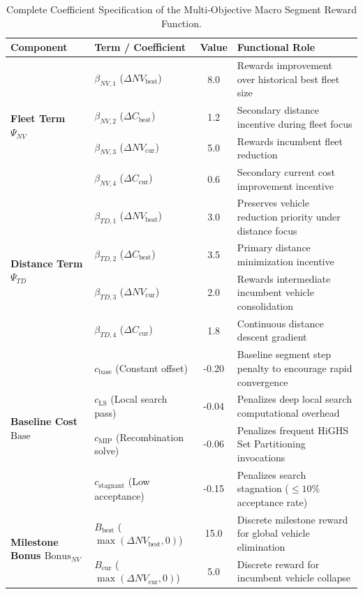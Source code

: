 \documentclass{article}
\begin{document}
\begin{table}[!htbp]
\caption{Complete Coefficient Specification of the Multi-Objective Macro Segment Reward Function.}
\label{tab:supp_reward_coefficients}
\centering
\small
\begin{tabularx}{\textwidth}{l l c X}
\toprule
\textbf{Component} & \textbf{Term / Coefficient} & \textbf{Value} & \textbf{Functional Role} \\
\midrule
\multirow{4}{*}{\textbf{Fleet Term $\Psi_{NV}$}}
 & $\beta_{NV, 1}$ ($\Delta NV_{\text{best}}$) & 8.0 & Rewards improvement over historical best fleet size \\
 & $\beta_{NV, 2}$ ($\Delta C_{\text{best}}$) & 1.2 & Secondary distance incentive during fleet focus \\
 & $\beta_{NV, 3}$ ($\Delta NV_{\text{cur}}$) & 5.0 & Rewards incumbent fleet reduction \\
 & $\beta_{NV, 4}$ ($\Delta C_{\text{cur}}$) & 0.6 & Secondary current cost improvement incentive \\
\midrule
\multirow{4}{*}{\textbf{Distance Term $\Psi_{TD}$}}
 & $\beta_{TD, 1}$ ($\Delta NV_{\text{best}}$) & 3.0 & Preserves vehicle reduction priority under distance focus \\
 & $\beta_{TD, 2}$ ($\Delta C_{\text{best}}$) & 3.5 & Primary distance minimization incentive \\
 & $\beta_{TD, 3}$ ($\Delta NV_{\text{cur}}$) & 2.0 & Rewards intermediate incumbent vehicle consolidation \\
 & $\beta_{TD, 4}$ ($\Delta C_{\text{cur}}$) & 1.8 & Continuous distance descent gradient \\
\midrule
\multirow{4}{*}{\textbf{Baseline Cost $\text{Base}$}}
 & $c_{\text{base}}$ (Constant offset) & -0.20 & Baseline segment step penalty to encourage rapid convergence \\
 & $c_{\text{LS}}$ (Local search pass) & -0.04 & Penalizes deep local search computational overhead \\
 & $c_{\text{MIP}}$ (Recombination solve) & -0.06 & Penalizes frequent HiGHS Set Partitioning invocations \\
 & $c_{\text{stagnant}}$ (Low acceptance) & -0.15 & Penalizes search stagnation ($\le 10\%$ acceptance rate) \\
\midrule
\multirow{2}{*}{\textbf{Milestone Bonus $\text{Bonus}_{NV}$}}
 & $B_{\text{best}}$ ($\max(\Delta NV_{\text{best}}, 0)$) & 15.0 & Discrete milestone reward for global vehicle elimination \\
 & $B_{\text{cur}}$ ($\max(\Delta NV_{\text{cur}}, 0)$) & 5.0 & Discrete reward for incumbent vehicle collapse \\
\bottomrule
\end{tabularx}
\end{table}
\end{document}

